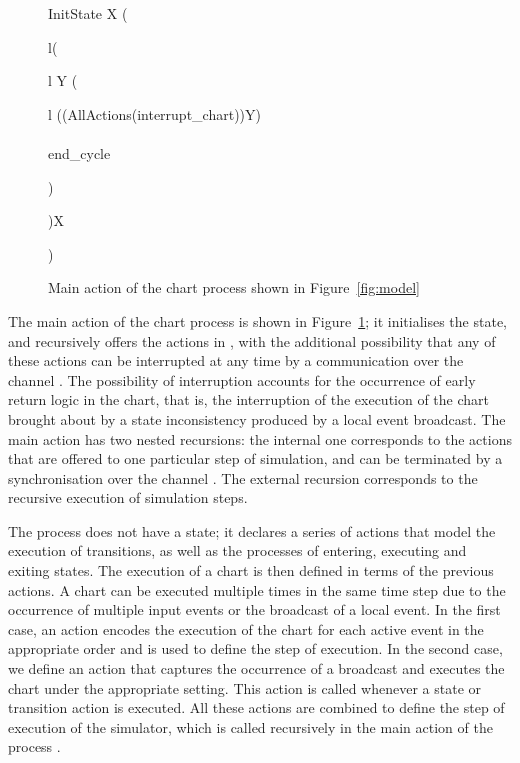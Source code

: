 \documentclass[submission]{eptcs}
\renewcommand{\circblockbegin}{\left(\begin{array}{l}}
\renewcommand{\circblockend}{\end{array}\right)}
\begin{document}
\begin{figure}
\centering
\hspace{-.8cm}
\begin{minipage}{\textwidth}
\begin{circus}
\circspot \lschexpract InitState \rschexpract \circseq
\circmu X \circspot \circblockbegin\circblockbegin
\circmu Y \circspot
\circblockbegin
((AllActions\circinterrupt(interrupt\_chart\then\Skip))\circseq Y)\\
\extchoice\\
end\_cycle\then\Skip
\circblockend
\circblockend\circseq X\circblockend\\
\circend
\end{circus}
\end{minipage}
\caption{Main action of the chart process shown in Figure~\ref{fig:model}}
\label{fig:chart-main-action}
\end{figure}

The main action of the chart process is shown in Figure~\ref{fig:chart-main-action}; it initialises the state, and recursively offers the actions in , with the additional possibility that any of these actions can be interrupted at any time by a communication over the channel . The possibility of interruption accounts for the occurrence of early return logic in the chart, that is, the interruption of the execution of the chart brought about by a state inconsistency produced by a local event broadcast. The main action has two nested recursions: the internal one corresponds to the actions that are offered to one particular step of simulation, and can be terminated by a synchronisation over the channel . The external recursion corresponds to the recursive execution of simulation steps.

The process  does not have a state; it declares a series of actions that model the execution of transitions, as well as the processes of entering, executing and exiting states. The execution of a chart is then defined in terms of the previous actions. A chart can be executed multiple times in the same time step due to the occurrence of multiple input events or the broadcast of a local event. In the first case, an action encodes the execution of the chart for each active event in the appropriate order and is used to define the step of execution. In the second case, we define an action that captures the occurrence of a broadcast and executes the chart under the appropriate setting. This action is called whenever a state or transition action is executed.
All these actions are combined to define the step of execution of the simulator, which is called recursively in the main action of the process .
\end{document}
